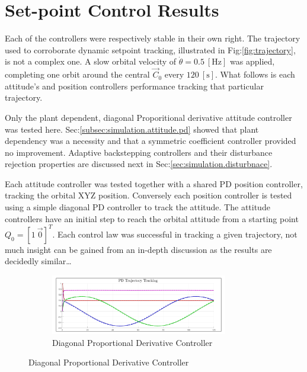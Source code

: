 \section{Set-point Control Results}
\label{sec:simulation.autopilot}
Each of the controllers were respectively stable in their own right. The trajectory used to corroborate dynamic setpoint tracking, illustrated in Fig:\ref{fig:trajectory}, is not a complex one. A slow orbital velocity of $\dot{\theta}=0.5~[\text{Hz}]$ was applied, completing one orbit around the central $\vec{C}_0$ every $120~[\text{s}]$. What follows is each attitude's and position controllers performance tracking that particular trajectory. 
\par
Only the plant dependent, diagonal Proporitional derivative attitude controller was tested here. Sec:\ref{subsec:simulation.attitude.pd} showed that plant dependency was a necessity and that a symmetric coefficient controller provided no improvement. Adaptive backstepping controllers and their disturbance rejection properties are discussed next in Sec:\ref{sec:simulation.disturbnace}.
\par
Each attitude controller was tested together with a shared PD position controller, tracking the orbital XYZ position. Conversely each position controller is tested using a simple diagonal PD controller to track the attitude. The attitude controllers have an initial step to reach the orbital attitude from a starting point $Q_0=[1~\vec{0}]^T$. Each control law was successful in tracking a given trajectory, not much insight can be gained from an in-depth discussion as the results are decidedly similar\ldots
\begin{figure}[hbtp]
\begin{subfigure}{\textwidth}
\centering
\includegraphics[width=0.85\textwidth]{graphs/PD_Diagonal_Dependent_Trajectory}
\caption{Diagonal Proportional Derivative Controller}
\end{subfigure}
\end{figure}
\par
